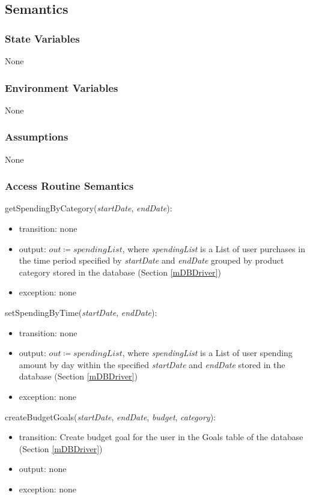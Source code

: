 \documentclass[12pt, titlepage]{article}
\begin{document}
\subsection{Semantics}

\subsubsection{State Variables}
None

\subsubsection{Environment Variables}
None

\subsubsection{Assumptions}
None

\subsubsection{Access Routine Semantics}

\noindent getSpendingByCategory(\textit{startDate}, \textit{endDate}):
\begin{itemize}
\item transition: none
\item output: \( \textit{out} \coloneqq spendingList \), where \textit{spendingList} is a List of user purchases in the time period specified by \textit{startDate} and \textit{endDate} grouped by product category stored in the database (Section \ref{mDBDriver})
\item exception: none
\end{itemize}

\noindent setSpendingByTime(\textit{startDate}, \textit{endDate}):
\begin{itemize}
\item transition: none
\item output: \( \textit{out} \coloneqq spendingList \), where \textit{spendingList} is a List of user spending amount by day within the specified \textit{startDate} and \textit{endDate} stored in the database (Section \ref{mDBDriver})
\item exception: none
\end{itemize}

\noindent createBudgetGoals(\textit{startDate}, \textit{endDate}, \textit{budget}, \textit{category}):
\begin{itemize}
\item transition: Create budget goal for the user in the Goals table of the database (Section \ref{mDBDriver})
\item output: none
\item exception: none
\end{itemize}
\end{document}
